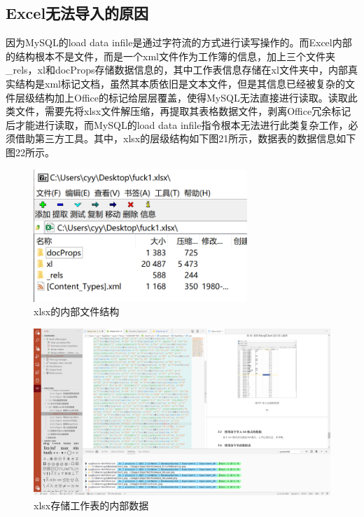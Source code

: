 \documentclass[a4paper,UTF8,heading=false,12pt]{article}
\begin{document}
\subsection{Excel无法导入的原因}

因为MySQL的load data infile是通过字符流的方式进行读写操作的。而Excel内部的结构根本不是文件，而是一个xml文件作为工作簿的信息，加上三个文件夹\_rels，xl和docProps存储数据信息的，其中工作表信息存储在xl文件夹中，内部真实结构是xml标记文档，虽然其本质依旧是文本文件，但是其信息已经被复杂的文件层级结构加上Office的标记给层层覆盖，使得MySQL无法直接进行读取。读取此类文件，需要先将xlsx文件解压缩，再提取其表格数据文件，剥离Office冗余标记后才能进行读取，而MySQL的load data infile指令根本无法进行此类复杂工作，必须借助第三方工具。其中，xlsx的层级结构如下图21所示，数据表的数据信息如下图22所示。

\begin{figure}[htbp]
    \centering
    \includegraphics[height=5cm]{../Images/XLSXStructures.png}
    \caption{xlsx的内部文件结构}
\end{figure}

\begin{figure}[htbp]
    \centering
    \includegraphics[width=15cm]{../Images/XLSXInnerData.png}
    \caption{xlsx存储工作表的内部数据}
\end{figure}
\end{document}
